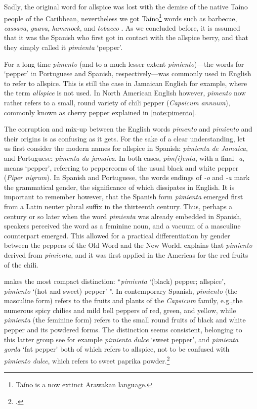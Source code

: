 Sadly, the original word for allspice was lost with the demise of the native Taíno people of the Caribbean, nevertheless we got Taíno\footnote{Taíno is a now extinct Arawakan language.} words such as barbecue, \textit{cassava}, \textit{guava}, \textit{hammock}, and \textit{tobacco} \autocite[229]{rafinesque_american_1836}. As we concluded before, it is assumed that it was the Spanish who first got in contact with the allspice berry, and that they simply called it \textit{pimienta} `pepper'.



For a long time \textit{pimento} (and to a much lesser extent \textit{pimiento})---the words for `pepper' in Portuguese and Spanish, respectively---was commonly used in English to refer to allspice. This is still the case in Jamaican English for example, where the term \textit{allspice} is not used. In North American English however, \textit{pimento} now rather refers to a small, round variety of chili pepper (\textit{Capsicum annuum}), commonly known as cherry pepper explained in \cref{note:pimento}. 

The corruption and mix-up between the English words \textit{pimento} and \textit{pimiento} and their origins is as confusing as it gets. For the sake of a clear understanding, let us first consider the modern names for allspice in Spanish: \textit{pimienta de Jamaica}, and Portuguese: \textit{pimenta-da-jamaica}. In both cases, \textit{pim\-(i)enta}, with a final \textit{-a}, means `pepper', referring to peppercorns of the usual black and white pepper (\textit{Piper nigrum}). In Spanish and Portuguese, the words endings of \textit{-o} and \textit{-a} mark the grammatical gender, the significance of which dissipates in English. It is important to remember however, that the Spanish form \textit{pimienta} emerged first from a Latin neuter plural suffix in the thirteenth century. Thus, perhaps a century or so later when the word \textit{pimienta} was already embedded in Spanish, speakers perceived the word as a feminine noun, and a vacuum of a masculine counterpart emerged. This allowed for a practical differentiation by gender between the peppers of the Old Word and the New World. \textcite[459]{corominas_breve_1987} explains that \textit{pimiento} derived from \textit{pimienta}, and it was first applied in the Americas for the red fruits of the chili.

\textcite[415]{gomez_de_silva_elseviers_1985} makes the most compact distinction: ``\textit{pimienta} `(black) pepper; allspice', \textit{pimiento} `(hot and sweet) pepper' ''. In contemporary Spanish, \textit{pimiento} (the masculine form) refers to the fruits and plants of the \textit{Capsicum} family, e.g.,the numerous spicy chilies and mild bell peppers of red, green, and yellow, while \textit{pimienta} (the feminine form) refers to the small round fruits of black and white pepper and its powdered forms. The distinction seems consistent, belonging to this latter group see for example \textit{pimienta dulce} `sweet pepper', and \textit{pimienta gorda} `fat pepper' both of which refers to allspice, not to be confused with \textit{pimiento dulce}, which refers to sweet paprika powder.\footcite[pimiento, -a]{dle}

